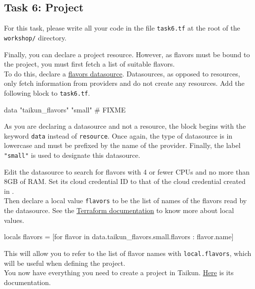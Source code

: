 \subsection{Task 6: Project}\label{sec:task6}

\begin{note}
For this task, please write all your code in the file \texttt{task6.tf}
at the root of the \texttt{workshop/} directory.
\end{note}

Finally, you can declare a project resource.
However, as flavors must be bound to the project,
you must first fetch a list of suitable flavors.\\

To do this, declare a \href{https://intuinewin.github.io/taikun-docs/data-sources/flavors.html}{flavors datasource}.
Datasources, as opposed to resources, only fetch information from providers and do not create any resources.
Add the following block to \texttt{task6.tf}.
\begin{tf}
data "taikun_flavors" "small" {
  # FIXME
}
\end{tf}

\begin{tip}
As you are declaring a datasource and not a resource, the block begins with the keyword \texttt{data} instead of \texttt{resource}.
Once again, the type of datasource is in lowercase and must be prefixed by the name of the provider.
Finally, the label \texttt{"small"} is used to designate this datasource.
\end{tip}

Edit the datasource to search for flavors with 4 or fewer CPUs and no more than 8GB of RAM.
Set its cloud credential ID to that of the cloud credential created in .\\

Then declare a local value \texttt{flavors} to be the list of names of the flavors read
by the datasource.
See the \href{https://www.terraform.io/docs/language/values/locals.html}{Terraform documentation}
to know more about local values.
\begin{tf}
locals {
  flavors = [for flavor in data.taikun_flavors.small.flavors : flavor.name]
}
\end{tf}
This will allow you to refer to the list of flavor names with \texttt{local.flavors},
which will be useful when defining the project.\\

You now have everything you need to create a project in Taikun.
\href{https://intuinewin.github.io/taikun-docs/resources/project.html}{Here} is its documentation.\\

